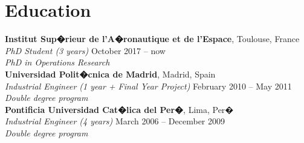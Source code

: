\section{Education}

    \textbf{Institut Sup�rieur de l'A�ronautique et de l'Espace}, Toulouse, France \vspace{0mm}\\%
        \textsl{PhD Student (3 years)}
            \hfill October 2017 -- now \\\vspace{0mm}
        \textsl{PhD in Operations Research} \vspace{2mm}
        \vspace{2mm}\\\vspace{0mm}%
    \textbf{Universidad Polit�cnica de Madrid}, Madrid, Spain \vspace{0mm}\\%
    	\textsl{Industrial Engineer (1 year + Final Year Project)}
    		\hfill February 2010 -- May 2011 \\\vspace{0mm}
    	\textsl{Double degree program} \vspace{2mm}
		\vspace{2mm}\\\vspace{0mm}%
    \textbf{Pontificia Universidad Cat�lica del Per�}, Lima, Per� \vspace{0mm}\\%
    	\textsl{Industrial Engineer (4 years)}
    		\hfill March 2006 -- December 2009 \\\vspace{0mm}
    	\textsl{Double degree program} \vspace{2mm}
